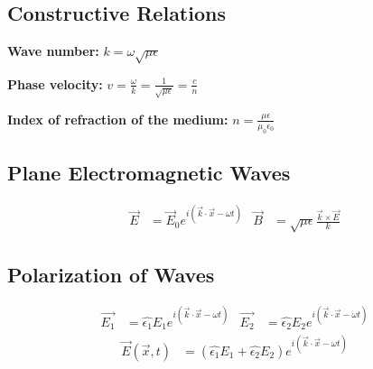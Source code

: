 \documentclass[a4paper, 11pt, landscape]{article}
\begin{document}
\begin{multicols*}{3}
\subsection{Constructive Relations}
\begin{compactenum}
    \item \textbf{Wave number:} $k = \omega\sqrt{\mu \epsilon}$
	\item \textbf{Phase velocity:} $v = \frac{\omega}{k} = \frac{1}{\sqrt{\mu \epsilon}} = \frac{c}{n}$ 
	\item \textbf{Index of refraction of the medium:} $n = \frac{\mu \epsilon}{\mu_{0} \epsilon_{0}}$
\end{compactenum}

\subsection{Plane Electromagnetic Waves}
\begin{compactenum}
	\begin{align*}
	    \vec{E} &= \vec{E}_{0}e^{i(\vec{k}\cdot\vec{x} - \omega t)} &
	    \vec{B} &= \sqrt{\mu \epsilon}\frac{\vec{k}\times\vec{E}}{k}
	\end{align*}
\end{compactenum}

\subsection{Polarization of Waves}
\begin{compactenum}
	\begin{align*}
	    \vec{E_{1}} &= \hat{\epsilon_{1}}E_{1}e^{i(\vec{k}\cdot\vec{x} - \omega t)}  &
	    \vec{E_{2}} &= \hat{\epsilon_{2}}E_{2}e^{i(\vec{k}\cdot\vec{x} - \omega t)}
	\end{align*}
	\begin{align*}
	    \vec{E}(\vec{x}, t) &= (\hat{\epsilon_{1}}E_{1} + \hat{\epsilon_{2}}E_{2})e^{i(\vec{k}\cdot\vec{x} - \omega t)}   
	\end{align*}
\end{compactenum}


\end{multicols*}
\end{document}
